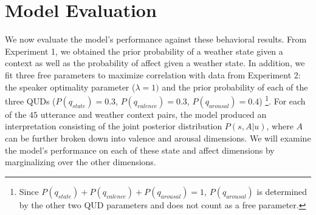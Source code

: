 \documentclass[10pt,letterpaper]{article}
\begin{document}
\section{Model Evaluation}
We now evaluate the model's performance against these behavioral results. From Experiment 1, we obtained the prior probability of a weather state given a context as well as the probability of affect given a weather state. In addition, we fit three free parameters to maximize correlation with data from Experiment 2: the speaker optimality parameter ($\lambda = 1)$ and the prior probability of each of the three QUDs ($P(q_{state}) = 0.3$, $P(q_{valence}) = 0.3$, $P(q_{arousal}) = 0.4$) \footnote{Since $P(q_{state}) + P(q_{valence}) + P(q_{arousal}) = 1$, $P(q_{arousal})$ is determined by the other two QUD parameters and does not count as a free parameter.}.
For each of the $45$ utterance and weather context pairs, the model produced an interpretation consisting of the joint posterior distribution $P(s, A | u)$, where $A$ can be further broken down into valence and arousal dimensions. We will examine the model's performance on each of these state and affect dimensions by marginalizing over the other dimensions.
\end{document}
